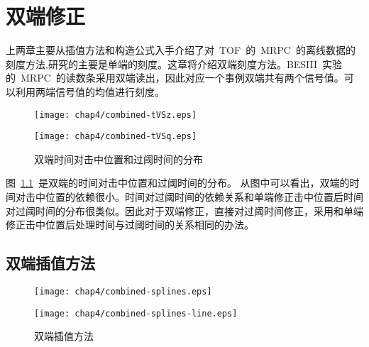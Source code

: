 \chapter{双端修正}
上两章主要从插值方法和构造公式入手介绍了对~TOF~的~MRPC~的离线数据的刻度方法,研究的主要是单端的刻度。这章将介绍双端刻度方法。BESIII~实验的~MRPC~的读数条采用双端读出，因此对应一个事例双端共有两个信号值。可以利用两端信号值的均值进行刻度。

\begin{figure}[!h]
\begin{minipage}[!h]{0.5\linewidth}
\texttt{[image: chap4/combined-tVSz.eps]}
\label{fig:combined-tVSz}
\end{minipage}%
\hfill
\begin{minipage}[!h]{0.5\linewidth}
\texttt{[image: chap4/combined-tVSq.eps]}
\label{fig:combined-tVSq}
\end{minipage}
\caption{双端时间对击中位置和过阈时间的分布}
\label{fig:combined}
\end{figure}

图~\ref{fig:combined}~是双端的时间对击中位置和过阈时间的分布。
从图中可以看出，双端的时间对击中位置的依赖很小。时间对过阈时间的依赖关系和单端修正击中位置后时间对过阈时间的分布很类似。因此对于双端修正，直接对过阈时间修正，采用和单端修正击中位置后处理时间与过阈时间的关系相同的办法。

\section{双端插值方法}

\begin{figure}[!h]
\begin{minipage}[!h]{0.5\linewidth}
\texttt{[image: chap4/combined-splines.eps]}
\label{fig:combined-splines}
\end{minipage}%
\hfill
\begin{minipage}[!h]{0.5\linewidth}
\texttt{[image: chap4/combined-splines-line.eps]}
\label{fig:combined-splines-line}
\end{minipage}
\caption{双端插值方法}
\end{figure}

